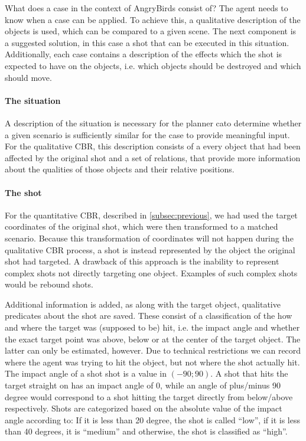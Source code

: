 What does a case in the context of AngryBirds consist of?
The agent needs to know when a case can be applied. To achieve this, a qualitative description of the objects is used, which can be compared to a given scene.
The next component is a suggested solution, in this case a shot that can be executed in this situation.
Additionally, each case contains a description of the effects which the shot is expected to have on the objects, i.e. which objects should be destroyed and which should move.

\paragraph{The situation}
A description of the situation is necessary for the planner cato determine whether a given scenario is sufficiently similar for the case to provide meaningful input.
For the qualitative CBR, this description consists of a every object that had been affected by the original shot and a set of relations, that provide more information about the qualities of those objects and their relative positions.


\paragraph{The shot}
For the quantitative CBR, described in \ref{subsec:previous}, we had used the target coordinates of the original shot, which were then transformed to a matched scenario.
Because this transformation of coordinates will not happen during the qualitative CBR process, a shot is instead represented by the object the original shot had targeted.
A drawback of this approach is the inability to represent complex shots not directly targeting one object.
Examples of such complex shots would be rebound shots.

Additional information is added, as along with the target object, qualitative predicates about the shot are saved. These consist of a classification of the how and where the target was (supposed to be) hit, i.e. the impact angle and whether the exact target point was above, below or at the center of the target object.
The latter can only be estimated, however. Due to technical restrictions we can record where the agent was trying to hit the object, but not where the shot actually hit.
The impact angle of a shot shot is a value in $(-90;90)$. A shot that hits the target straight on has an impact angle of 0, while an angle of plus/minus 90 degree would correspond to a shot hitting the target directly from below/above respectively. Shots are categorized based on the absolute value of the impact angle according to: If it is less than 20 degree, the shot is called ``low'', if it is less than 40 degrees, it is ``medium'' and otherwise, the shot is classified as ``high''.

